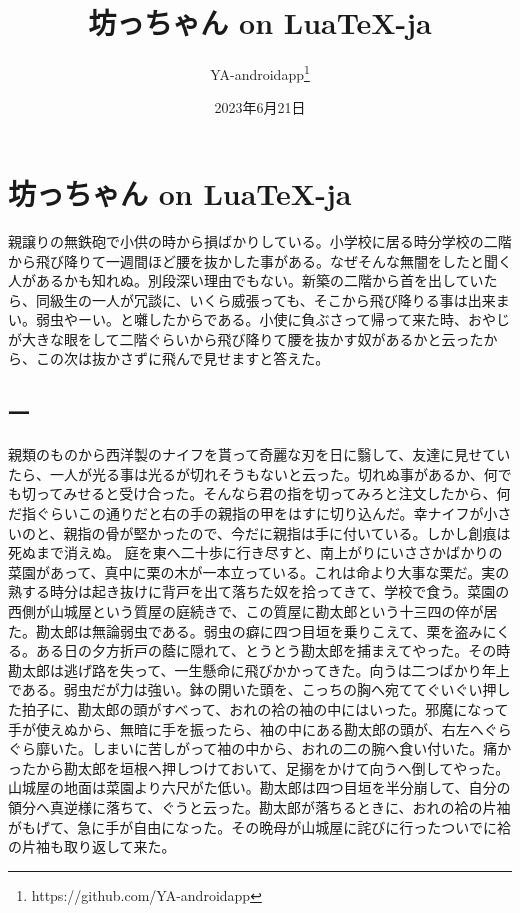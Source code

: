 \documentclass{ltjsarticle}
\title{坊っちゃん on Lua\TeX-ja}
\author{YA-androidapp\thanks{https://github.com/YA-androidapp}}
\date{2023年6月21日}
\begin{document}
\maketitle

\section{坊っちゃん on Lua\TeX-ja}
親譲りの無鉄砲で小供の時から損ばかりしている。小学校に居る時分学校の二階から飛び降りて一週間ほど腰を抜かした事がある。なぜそんな無闇をしたと聞く人があるかも知れぬ。別段深い理由でもない。新築の二階から首を出していたら、同級生の一人が冗談に、いくら威張っても、そこから飛び降りる事は出来まい。弱虫やーい。と囃したからである。小使に負ぶさって帰って来た時、おやじが大きな眼をして二階ぐらいから飛び降りて腰を抜かす奴があるかと云ったから、この次は抜かさずに飛んで見せますと答えた。
\subsection{一}
親類のものから西洋製のナイフを貰って奇麗な刃を日に翳して、友達に見せていたら、一人が光る事は光るが切れそうもないと云った。切れぬ事があるか、何でも切ってみせると受け合った。そんなら君の指を切ってみろと注文したから、何だ指ぐらいこの通りだと右の手の親指の甲をはすに切り込んだ。幸ナイフが小さいのと、親指の骨が堅かったので、今だに親指は手に付いている。しかし創痕は死ぬまで消えぬ。
庭を東へ二十歩に行き尽すと、南上がりにいささかばかりの菜園があって、真中に栗の木が一本立っている。これは命より大事な栗だ。実の熟する時分は起き抜けに背戸を出て落ちた奴を拾ってきて、学校で食う。菜園の西側が山城屋という質屋の庭続きで、この質屋に勘太郎という十三四の倅が居た。勘太郎は無論弱虫である。弱虫の癖に四つ目垣を乗りこえて、栗を盗みにくる。ある日の夕方折戸の蔭に隠れて、とうとう勘太郎を捕まえてやった。その時勘太郎は逃げ路を失って、一生懸命に飛びかかってきた。向うは二つばかり年上である。弱虫だが力は強い。鉢の開いた頭を、こっちの胸へ宛ててぐいぐい押した拍子に、勘太郎の頭がすべって、おれの袷の袖の中にはいった。邪魔になって手が使えぬから、無暗に手を振ったら、袖の中にある勘太郎の頭が、右左へぐらぐら靡いた。しまいに苦しがって袖の中から、おれの二の腕へ食い付いた。痛かったから勘太郎を垣根へ押しつけておいて、足搦をかけて向うへ倒してやった。山城屋の地面は菜園より六尺がた低い。勘太郎は四つ目垣を半分崩して、自分の領分へ真逆様に落ちて、ぐうと云った。勘太郎が落ちるときに、おれの袷の片袖がもげて、急に手が自由になった。その晩母が山城屋に詫びに行ったついでに袷の片袖も取り返して来た。
\end{document}
